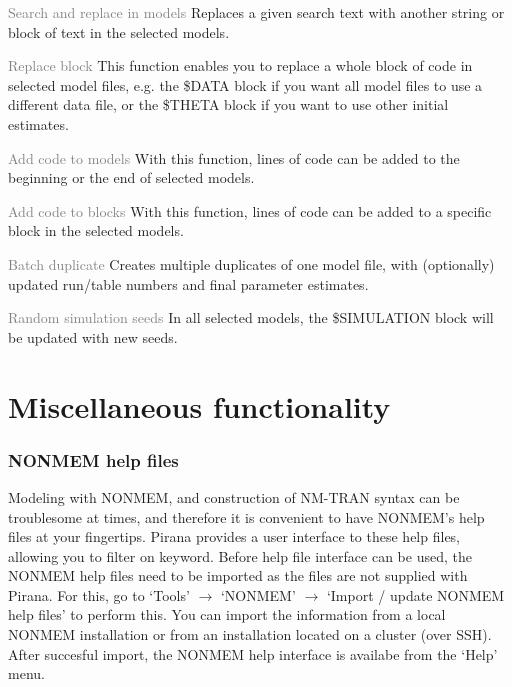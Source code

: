 {{{{\begin{description}
	\item{\textcolor{Grey}{Search and replace in models}} Replaces
          a given search text with another string or block of text in
          the selected models.
	\item{\textcolor{Grey}{Replace block}} This function enables
          you to replace a whole block of code in selected model
          files, e.g. the \$DATA block if you want all model files to
          use a different data file, or the \$THETA block if you want
          to use other initial estimates.
	\item{\textcolor{Grey}{Add code to models}} With this
          function, lines of code can be added to the beginning or the
          end of selected models.
	\item{\textcolor{Grey}{Add code to blocks}} With this
          function, lines of code can be added to a specific block in
          the selected models.
	\item{\textcolor{Grey}{Batch duplicate}} Creates multiple
          duplicates of one model file, with (optionally) updated
          run/table numbers and final parameter estimates.
	\item{\textcolor{Grey}{Random simulation seeds}} In all
          selected models, the \$SIMULATION block will be updated with
          new seeds.
\end{description}

\section{Miscellaneous  functionality}

\subsubsection*{NONMEM help files}
Modeling with NONMEM, and construction of NM-TRAN syntax can be
troublesome at times, and therefore it is convenient to have NONMEM's
help files at your fingertips. Pirana provides a user interface to
these help files, allowing you to filter on keyword. Before help file
interface can be used, the NONMEM help files need to be imported as
the files are not supplied with Pirana. For this, go to `Tools'
$\rightarrow$ `NONMEM' $\rightarrow$ `Import / update NONMEM help
files' to perform this. You can import the information from a local
NONMEM installation or from an installation located on a cluster (over
SSH). After succesful import, the NONMEM help interface is availabe
from the `Help' menu.

}}}}
